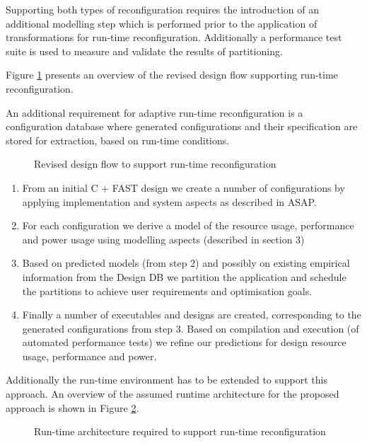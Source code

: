 Supporting both types of reconfiguration requires the introduction of
an additional modelling step which is performed prior to the
application of transformations for run-time
reconfiguration. Additionally a performance test suite is used to
measure and validate the results of partitioning.

Figure \ref{fig:reconfig-design-flow} presents an overview of the
revised design flow supporting run-time reconfiguration.

An additional requirement for adaptive run-time reconfiguration is a
configuration database where generated configurations and their
specification are stored for extraction, based on run-time
conditions.

\begin{figure}[!ht]
  \centering
  \def\svgwidth{\textwidth}
  
  \caption{Revised design flow to support run-time reconfiguration}
  \label{fig:reconfig-design-flow}
\end{figure}

\begin{enumerate}
\item From an initial C + FAST design we create a number of
  configurations by applying implementation and system aspects as
  described in ASAP.
\item For each configuration we derive a model of the resource usage,
  performance and power usage using modelling aspects (described in
  section 3)
\item Based on predicted models (from step 2) and possibly on existing
  empirical information from the Design DB we partition the
  application and schedule the partitions to achieve user requirements
  and optimisation goals.
\item Finally a number of executables and designs are created,
  corresponding to the generated configurations from step 3. Based on
  compilation and execution (of automated performance tests) we refine
  our predictions for design resource usage, performance and power.
\end{enumerate}

Additionally the run-time environment has to be extended to support
this approach. An overview of the assumed runtime architecture for the
proposed approach is shown in Figure \ref{fig:reconfig-runtime}.

\begin{figure}[!ht]
  \centering
  \def\svgwidth{30em}
  
  \caption{Run-time architecture required to support run-time reconfiguration}
  \label{fig:reconfig-runtime}
\end{figure}

